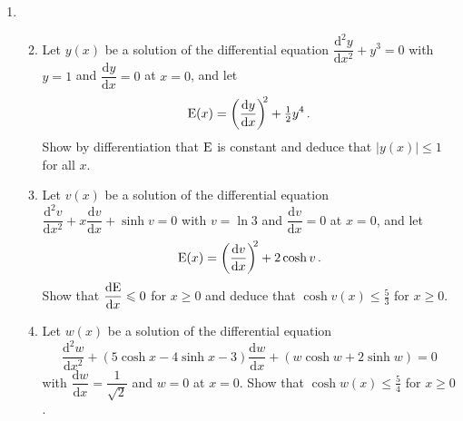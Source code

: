 \documentclass[a4, 11pt]{report}
\newlength{\qspace}
\newcounter{qnumber}
\newenvironment{question}%
 {\vspace{\qspace}
  \begin{enumerate}[\bfseries 1\quad][10]%
    \setcounter{enumi}{\value{qnumber}}%
    \item%
 }
{
  \end{enumerate}
  \filbreak
  \stepcounter{qnumber}
 }
\newenvironment{questionparts}[1][1]%
 {
  \begin{enumerate}[\bfseries (i)]%
    \setcounter{enumii}{#1}
    \addtocounter{enumii}{-1}
    \setlength{\itemsep}{5mm}
    \setlength{\parskip}{8pt}
 }
 {
  \end{enumerate}
 }
\def\d{{\mathrm d}}
\def\le{\leqslant}
\def\ge{\geqslant}
\begin{document}
\begin{question}
\begin{questionparts}
\item Let $y(x)$ be a solution of the differential equation 
$  \dfrac {\d^2 y}{\d x^2}+y^3=0$ 
with $y = 1$ and $\dfrac{\d y}{\d x} =0$ at $x=0$, and let
 \[
{\rm E} (x)=
\left ( \frac {\d y}{\d x}\right)^{\!\!2} + \tfrac 12 y^4\,.
\]
Show by differentiation that ${\rm E}$
is constant and deduce that $ \vert y(x) \vert \le 1$ for all $x$.


\item Let $v(x)$ be a solution of the differential equation 
$ 
\dfrac{\d^2 v}{\d x^2} + x \dfrac {\d v}{\d x} +\sinh v =0
$  
with $v = \ln 3$ and $\dfrac{\d v}{\d x} =0$ at $x=0$, and let
 \[
{\rm E} (x)=
\left ( \frac {\d v}{\d x}\right)^{\!\!2} + 2 \cosh v\,.
\]
Show that $\dfrac{\d{\rm E}}{\d x}\le 0$ for $x\ge0$ 
and deduce that $\cosh v(x) \le \frac53$
 for $x\ge0$.



\item Let $w(x)$ be a solution of the differential equation 
\[
\frac{\d^2 w}{\d x^2} + (5\cosh x - 4 \sinh x -3) \frac{\d w}{\d x} + 
(w\cosh w + 2 \sinh w) =0
\]
with $\dfrac{\d w }{\d x}=\dfrac 1 { \sqrt 2 }$ and $w=0$ at $x=0$. 
Show that $\cosh w(x)  \le \frac54$ for $x\ge0$. 

\end{questionparts}
\end{question}
		
\end{document}
